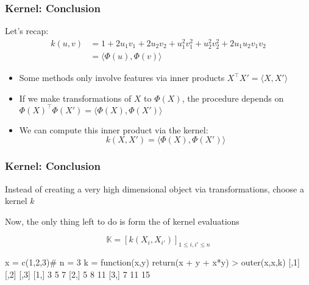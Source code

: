 \documentclass[12pt]{beamer}
\begin{document}
\begin{frame}
\frametitle{Kernel: Conclusion}
Let's recap:
\begin{align*}
k(u,v) & = 1 + 2u_1v_1 + 2u_2v_2 + u_1^2v_1^2 + u_2^2v_2^2 + 2u_1u_2v_1v_2  \\
& =
\langle \Phi(u) , \Phi(v) \rangle
\end{align*}

\begin{itemize}
\item Some methods only involve features via inner products $X^{\top}X' = \langle X, X'\rangle$

\item If we make transformations of $X$ to $\Phi(X)$, the procedure depends on 
$\Phi(X)^{\top}\Phi(X') = \langle \Phi(X), \Phi(X')\rangle$
\item {} We can compute this inner product via the kernel:
\[
k(X,X') = \langle \Phi(X), \Phi(X')\rangle
\]
\end{itemize}
\end{frame}

\begin{frame}[fragile]
\frametitle{Kernel: Conclusion}
Instead of creating a very high dimensional object via transformations,
choose a kernel $k$

\vsp
Now, the only thing left to do is form the  of kernel evaluations

\[
\mathbb{K} = [k(X_i,X_{i'})]_{1\leq i,i'\leq n}
\]
\begin{blockcode}
x = c(1,2,3)# n = 3
k = function(x,y){ return(x + y + x*y)}
> outer(x,x,k)
     [,1] [,2] [,3]
[1,]    3    5    7
[2,]    5    8   11
[3,]    7   11   15
\end{blockcode}
\end{frame}
%
\end{document}
